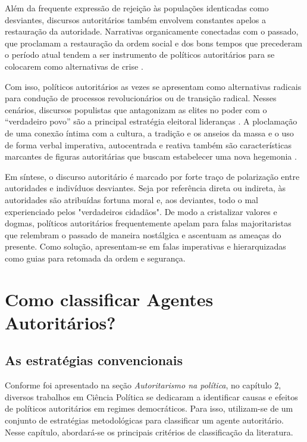\documentclass[
12pt,				%
openright,			%
twoside,			%
a4paper,			%
english,			%
french,				%
spanish,			%
brazil				%
]{abntex2}
\begin{document}
Além da frequente expressão de rejeição às populações identicadas como desviantes, discursos autoritários também envolvem constantes apelos a restauração da autoridade. Narrativas organicamente conectadas com o passado, que proclamam a restauração da ordem social e dos bons tempos que precederam o período atual tendem a ser instrumento de políticos autoritários para se colocarem como alternativas de crise \cite{pinto2004indoctrinating, mietzner2014indonesia}. 

Com isso, políticos autoritários as vezes se apresentam como alternativas radicais para condução de processos revolucionários ou de transição radical. Nesses cenários, discursos populistas que antagonizam as elites no poder com o ``verdadeiro povo'' são a principal estratégia eleitoral lideranças \cite{muller2017populism, levitsky2018democracies}. A ploclamação de uma conexão íntima com a cultura, a tradição e os anseios da massa e o uso de forma verbal imperativa, autocentrada e reativa também são características marcantes de figuras autoritárias que buscam estabelecer uma nova hegemonia \cite{goldschlager1982towards, gounari2018authoritarianism, hunter2019bolsonaro}.

Em síntese, o discurso autoritário é marcado por forte traço de polarização entre autoridades e indivíduos desviantes. Seja por referência direta ou indireta, às autoridades são atribuídas fortuna moral e, aos deviantes, todo o mal experienciado pelos "verdadeiros cidadãos". De modo a cristalizar valores e dogmas, políticos autoritários frequentemente apelam para falas majoritaristas que relembram o passado de maneira nostálgica e ascentuam as ameaças do presente. Como solução, apresentam-se em falas imperativas e hierarquizadas como guias para retomada da ordem e segurança. 


\chapter{Como classificar Agentes Autoritários?}\label{metodologia}

\section{As estratégias convencionais}

Conforme foi apresentado na seção \emph{Autoritarismo na política}, no capítulo 2, diversos trabalhos em Ciência Política se dedicaram a identificar causas e efeitos de políticos autoritários em regimes democráticos. Para isso, utilizam-se de um conjunto de estratégias metodológicas para classificar um agente autoritário. Nesse capítulo, abordará-se os principais critérios de classificação da literatura.
\end{document}
